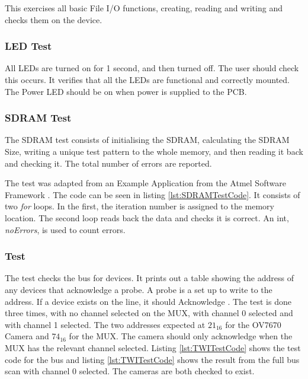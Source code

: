 This exercises all basic File I/O functions, creating, reading and writing and checks them on the device.

\subsubsection{LED Test}
All LEDs are turned on for 1 second, and then turned off. The user should check this occurs. It verifies that all the LEDs are functional and correctly mounted. The Power LED should be on when power is supplied to the PCB. 

\subsubsection{SDRAM Test}
The SDRAM test consists of initialising the SDRAM, calculating the SDRAM Size, writing a unique test pattern to the whole memory, and then reading it back and checking it. The total number of errors are reported. 

The test was adapted from an Example Application from the Atmel Software Framework \citep{Atmel:ASF}. The code can be seen in listing \ref{lst:SDRAMTestCode}. It consists of two \textit{for} loops. In the first, the iteration number is assigned to the memory location. The second loop reads back the data and checks it is correct. An int, \textit{noErrors}, is used to count errors. 



\subsubsection{\itc Test}
The \itc test checks the bus for devices. It prints out a table showing the address of any devices that acknowledge a probe. A probe is a set up to write to the address. If a device exists on the line, it should Acknowledge \citep{Philips:I2C}. The test is done three times, with no channel selected on the \itc MUX, with channel 0 selected and with channel 1 selected. The two addresses expected at $21_{16}$ for the OV7670 Camera and $74_{16}$ for the \itc MUX. The camera should only acknowledge when the \itc MUX has the relevant channel selected. Listing \ref{lst:TWITestCode} shows the test code for the \itc bus and listing \ref{lst:TWITestCode} shows the result from the full bus scan with channel 0 selected. The cameras are both checked to exist.


